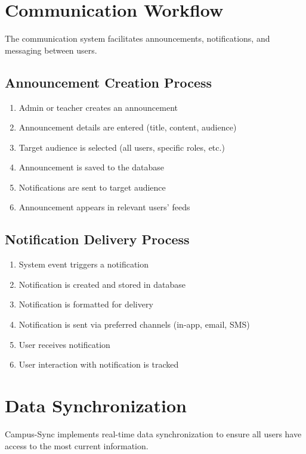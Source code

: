 \section{Communication Workflow}

The communication system facilitates announcements, notifications, and messaging between users.

\subsection{Announcement Creation Process}

\begin{enumerate}
    \item Admin or teacher creates an announcement
    \item Announcement details are entered (title, content, audience)
    \item Target audience is selected (all users, specific roles, etc.)
    \item Announcement is saved to the database
    \item Notifications are sent to target audience
    \item Announcement appears in relevant users' feeds
\end{enumerate}

\subsection{Notification Delivery Process}

\begin{enumerate}
    \item System event triggers a notification
    \item Notification is created and stored in database
    \item Notification is formatted for delivery
    \item Notification is sent via preferred channels (in-app, email, SMS)
    \item User receives notification
    \item User interaction with notification is tracked
\end{enumerate}

\section{Data Synchronization}

Campus-Sync implements real-time data synchronization to ensure all users have access to the most current information.

